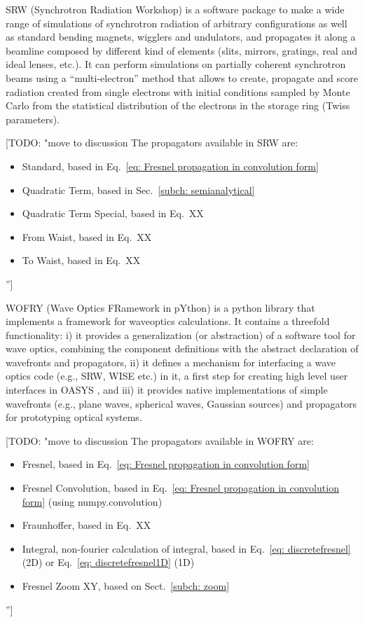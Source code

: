 \documentclass{iucr}              %
\newcommand{\todo}[1]{{\color{red}[TODO: "#1'']}}
\newcommand{\inred}[1]{{\color{red}#1}}
\begin{document}
SRW \cite{Chubar1998} (Synchrotron Radiation Workshop) is a software package to make a wide range of simulations of synchrotron radiation of arbitrary configurations as well as standard bending magnets, wigglers and undulators, and propagates it along a beamline composed by different kind of elements (slits, mirrors, gratings, real and ideal lenses, etc.). It can perform simulations on partially coherent synchrotron beams using a ``multi-electron'' method that allows to create, propagate and score radiation created from single electrons with initial conditions sampled by Monte Carlo from the statistical distribution of the electrons in the storage ring (Twiss parameters). 
\todo{move to discussion 
The propagators available in SRW are: 
\begin{itemize}
    \item Standard, based in Eq.~\ref{eq: Fresnel propagation in convolution form}
    \item Quadratic Term, based in Sec.~\ref{subch: semianalytical}
    \item Quadratic Term Special, based in Eq.~XX
    \item From Waist, based in Eq.~XX
    \item To Waist, based in Eq.~XX
\end{itemize}
}

WOFRY \cite{Wofrygit} (Wave Optics FRamework in pYthon) is a python library that implements a framework for waveoptics calculations. It contains a threefold functionality: i) it provides a generalization (or abstraction) of a software tool for wave optics, combining the component definitions with the abstract declaration of wavefronts and propagators, ii) it defines a mechanism for interfacing a wave optics code (e.g., SRW, WISE etc.) in it, a first step for creating high level user interfaces in OASYS \cite{oasys}, and iii) it provides native implementations of simple wavefronts (e.g., plane waves, spherical waves, Gaussian sources) and propagators for prototyping optical systems.
\todo{move to discussion 
The propagators available in WOFRY are: 
\begin{itemize}
    \item Fresnel, based in Eq.~\ref{eq: Fresnel propagation in convolution form}
    \item Fresnel Convolution, based in Eq.~\ref{eq: Fresnel propagation in convolution form} \inred{(using numpy.convolution)}
    \item Fraunhoffer, based in Eq.~XX
    \item Integral, non-fourier calculation of integral, based in Eq.~\ref{eq: discretefresnel} (2D) or Eq.~\ref{eq: discretefresnel1D} (1D)
    \item Fresnel Zoom XY, based on Sect.~\ref{subch: zoom}
\end{itemize}
}
\end{document}
